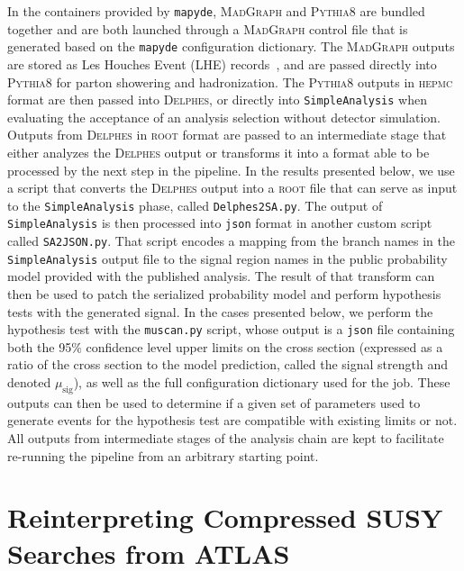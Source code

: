 \documentclass{article}
\newcommand{\mapyde}{\texttt{mapyde}}
\newcommand{\simpleanalysis}{\texttt{SimpleAnalysis}}
\newcommand{\madgraph}{\textsc{MadGraph}}
\newcommand{\pythia}{\textsc{Pythia8}}
\newcommand{\delphes}{\textsc{Delphes}}
\newcommand{\musig}{\ensuremath{\mu_{\mathrm{sig}}}}
\newcommand{\hepmc}{\textsc{hepmc}}
\newcommand{\ROOT}{\textsc{root}}
\newcommand{\json}{\texttt{json}}
\begin{document}
In the containers provided by \mapyde, \madgraph{} and \pythia{} are bundled together and are both launched through a \madgraph{} control file that is generated based on the \mapyde{} configuration dictionary.  The \madgraph{} outputs are stored as Les Houches Event (LHE) records~\cite{Alwall:2006yp}, and are passed directly into \pythia{} for parton showering and hadronization.  The \pythia{} outputs in \hepmc{} format are then passed into \delphes{}, or directly into \simpleanalysis{} when evaluating the acceptance of an analysis selection without detector simulation.  Outputs from \delphes{} in \ROOT{} format are passed to an intermediate stage that either analyzes the \delphes{} output or transforms it into a format able to be processed by the next step in the pipeline.  In the results presented below, we use a script that converts the \delphes{} output into a \ROOT{} file that can serve as input to the \simpleanalysis{} phase, called \texttt{Delphes2SA.py}.  The output of \simpleanalysis{} is then processed into \json{} format in another custom script called \texttt{SA2JSON.py}.  That script encodes a mapping from the branch names in the \simpleanalysis{} output file to the signal region names in the public probability model provided with the published analysis.  The result of that transform can then be used to patch the serialized probability model and perform hypothesis tests with the generated signal.  In the cases presented below, we perform the hypothesis test with the \texttt{muscan.py} script, whose output is a \json{} file containing both the 95\% confidence level upper limits on the cross section (expressed as a ratio of the cross section to the model prediction, called the signal strength and denoted \musig), as well as the full configuration dictionary used for the job.  These outputs can then be used to determine if a given set of parameters used to generate events for the hypothesis test are compatible with existing limits or not.  All outputs from intermediate stages of the analysis chain are kept to facilitate re-running the pipeline from an arbitrary starting point.

\section{Reinterpreting Compressed SUSY Searches from ATLAS}
\label{sec:reinterpreting-compressed-susy-searches-from-atlas}
\end{document}
